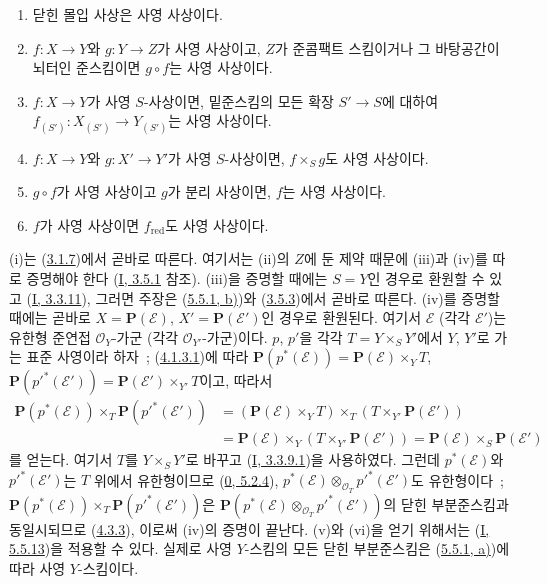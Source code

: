 \begin{proposition}[5.5.5]
\label{II.5.5.5-ko}
\begin{enumerate}
  \item[\rm{(i)}] 닫힌 몰입 사상은 사영 사상이다.
  \item[\rm{(ii)}] $f:X\to Y$와 $g:Y\to Z$가 사영 사상이고, $Z$가
  준콤팩트 스킴이거나 그 바탕공간이 뇌터인 준스킴이면 $g\circ f$는
  사영 사상이다.
  \item[\rm{(iii)}] $f:X\to Y$가 사영 $S$-사상이면, 밑준스킴의 모든
  확장 $S'\to S$에 대하여
  $f_{(S')}:X_{(S')}\to Y_{(S')}$는 사영 사상이다.
  \item[\rm{(iv)}] $f:X\to Y$와 $g:X'\to Y'$가 사영 $S$-사상이면,
  $f\times_Sg$도 사영 사상이다.
  \item[\rm{(v)}] $g\circ f$가 사영 사상이고 $g$가 분리 사상이면,
  $f$는 사영 사상이다.
  \item[\rm{(vi)}] $f$가 사영 사상이면 $f_{\mathrm{red}}$도 사영
  사상이다.
\end{enumerate}
\end{proposition}

(i)는 (\hyperref[II.3.1.7-ko]{3.1.7})에서 곧바로 따른다. 여기서는
(ii)의 $Z$에 둔 제약 때문에 (iii)과 (iv)를 따로 증명해야 한다
(\hyperref[I.3.5.1-ko]{I, 3.5.1} 참조). (iii)을 증명할 때에는
$S=Y$인 경우로 환원할 수 있고
(\hyperref[I.3.3.11-ko]{I, 3.3.11}), 그러면 주장은
(\hyperref[II.5.5.1-ko]{5.5.1, b)})와
(\hyperref[II.3.5.3-ko]{3.5.3})에서 곧바로 따른다. (iv)를 증명할
때에는 곧바로 $X=\mathbf{P}(\mathcal{E})$,
$X'=\mathbf{P}(\mathcal{E}')$인 경우로 환원된다. 여기서
$\mathcal{E}$ (각각 $\mathcal{E}'$)는 유한형 준연접
$\mathcal{O}_Y$-가군 (각각 $\mathcal{O}_{Y'}$-가군)이다. $p$, $p'$을
각각 $T=Y\times_SY'$에서 $Y$, $Y'$로 가는 표준 사영이라 하자~;
(\hyperref[II.4.1.3.1-ko]{4.1.3.1})에 따라
$\mathbf{P}(p^*(\mathcal{E}))=\mathbf{P}(\mathcal{E})\times_YT$,
$\mathbf{P}(p'^*(\mathcal{E}'))=\mathbf{P}(\mathcal{E}')\times_{Y'}T$이고,
따라서
\begin{align*}
\mathbf{P}(p^*(\mathcal{E}))\times_T\mathbf{P}(p'^*(\mathcal{E}'))
&=(\mathbf{P}(\mathcal{E})\times_YT)\times_T
(T\times_{Y'}\mathbf{P}(\mathcal{E}'))\\
&=\mathbf{P}(\mathcal{E})\times_Y
(T\times_{Y'}\mathbf{P}(\mathcal{E}'))
=\mathbf{P}(\mathcal{E})\times_S\mathbf{P}(\mathcal{E}')
\end{align*}
를 얻는다. 여기서 $T$를 $Y\times_SY'$로 바꾸고
(\hyperref[I.3.3.9.1-ko]{I, 3.3.9.1})을 사용하였다. 그런데
$p^*(\mathcal{E})$와 $p'^*(\mathcal{E}')$는 $T$ 위에서 유한형이므로
(\hyperref[0.5.2.4-ko]{0, 5.2.4}),
$p^*(\mathcal{E})\otimes_{\mathcal{O}_T}p'^*(\mathcal{E}')$도 유한형이다~;
$\mathbf{P}(p^*(\mathcal{E}))\times_T\mathbf{P}(p'^*(\mathcal{E}'))$은
$\mathbf{P}(p^*(\mathcal{E})\otimes_{\mathcal{O}_T}p'^*(\mathcal{E}'))$의
닫힌 부분준스킴과 동일시되므로
(\hyperref[II.4.3.3-ko]{4.3.3}), 이로써 (iv)의 증명이 끝난다. (v)와
(vi)을 얻기 위해서는 (\hyperref[I.5.5.13-ko]{I, 5.5.13})을 적용할 수
있다. 실제로 사영 $Y$-스킴의 모든 닫힌 부분준스킴은
(\hyperref[II.5.5.1-ko]{5.5.1, a)})에 따라 사영 $Y$-스킴이다.

